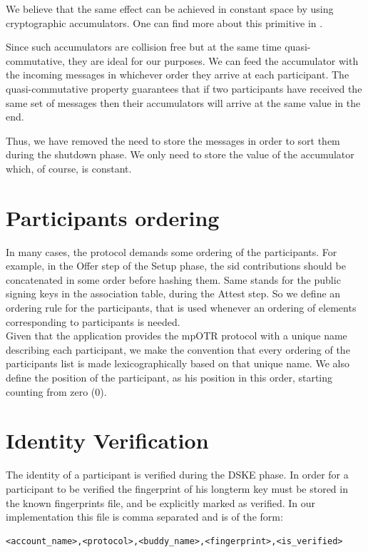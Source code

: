 \documentclass[12pt,titlepage,a4paper]{article}
\begin{document}
We believe that the same effect can be achieved in constant space by using
cryptographic accumulators. One can find more about this primitive in \cite{accum_def}.

Since such accumulators are collision free but at the same time quasi-commutative,
they are ideal for our purposes. We can feed the accumulator with the incoming
messages in whichever order they arrive at each participant. The quasi-commutative
property guarantees that if two participants have received the same set of messages
then their accumulators will arrive at the same value in the end.

Thus, we have removed the need to store the messages in order to sort them during
the shutdown phase. We only need to store the value of the accumulator which,
of course, is constant.

\section{Participants ordering}

In many cases, the protocol demands some ordering of the participants. For example, in the Offer step of the Setup phase, the sid contributions should be concatenated in some order before hashing them. Same stands for the public signing keys in the association table, during the Attest step. So we define an ordering rule for the participants, that is used whenever an ordering of elements corresponding to participants is needed. \\

Given that the application provides the mpOTR protocol with a unique name describing each participant, we make the convention that every ordering of the participants list is made lexicographically based on that unique name. We also define the position of the participant, as his position in this order, starting counting from zero (0).

\section{Identity Verification}
The identity of a participant is verified during the DSKE phase.
In order for a participant to be verified the fingerprint of his longterm key must be stored in the known fingerprints file, and be explicitly marked as verified.
In our implementation this file is comma separated and is of the form:

\begin{verbatim}
<account_name>,<protocol>,<buddy_name>,<fingerprint>,<is_verified>
\end{verbatim}
\end{document}
